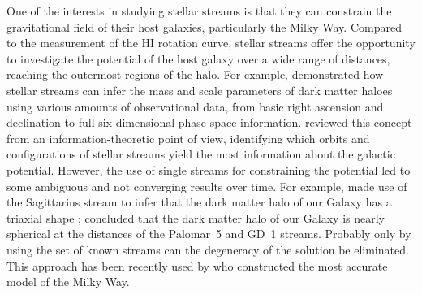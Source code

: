 \documentclass[draft]{aa}
\begin{document}
  One of the interests in studying stellar streams is that they can constrain the gravitational field of their host galaxies, particularly the Milky Way. Compared to the measurement of the HI rotation curve, stellar streams offer the opportunity to investigate the potential of the host galaxy over a wide range of distances, reaching the outermost regions of the halo. For example, \citet{2011MNRAS.417..198V} demonstrated how stellar streams can infer the mass and scale parameters of dark matter haloes using various amounts of observational data, from basic right ascension and declination to full six-dimensional phase space information. \citet{2018ApJ...867..101B} reviewed this concept from an information-theoretic point of view, identifying which orbits and configurations of stellar streams yield the most information about the galactic potential. However, the use of single streams for constraining the potential led to some ambiguous and not converging results over time. For example, \citet{2010ApJ...718.1128L} made use of the Sagittarius stream to infer that the dark matter halo of our Galaxy has a triaxial shape \citep[but see also][]{2004MNRAS.351..643H, 2005ApJ...619..800J, 2005ApJ...619..807L}; \citet{2016ApJ...833...31B} concluded that the dark matter halo of our Galaxy is nearly spherical at the distances of the Palomar~5 and GD~1 streams. Probably only by using the set of known streams can the degeneracy of the solution be eliminated. This approach has been recently used by \citet{2024ApJ...967...89I} who constructed the most accurate model of the Milky Way.


  
\end{document}
